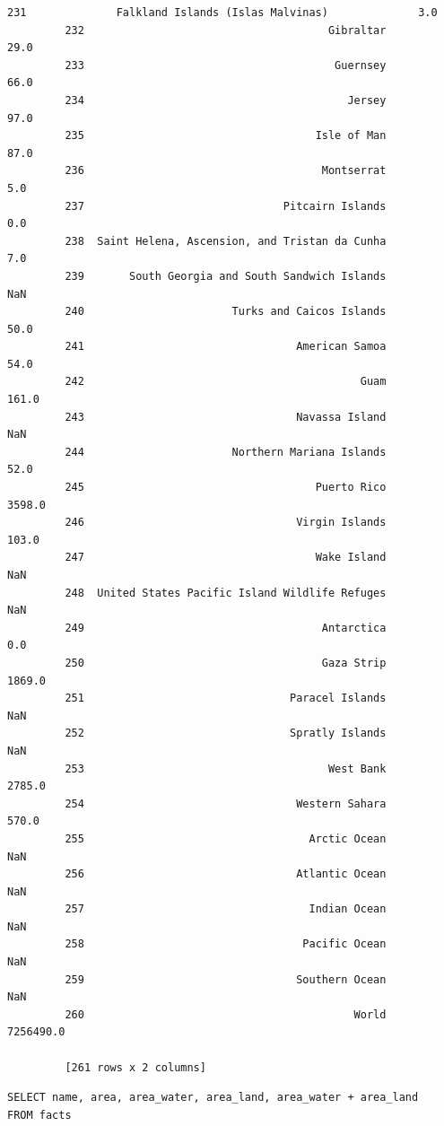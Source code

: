 \documentclass[11pt]{article}
\begin{document}
\begin{Verbatim}[commandchars=\\\{\}]
         231              Falkland Islands (Islas Malvinas)              3.0
         232                                      Gibraltar             29.0
         233                                       Guernsey             66.0
         234                                         Jersey             97.0
         235                                    Isle of Man             87.0
         236                                     Montserrat              5.0
         237                               Pitcairn Islands              0.0
         238  Saint Helena, Ascension, and Tristan da Cunha              7.0
         239       South Georgia and South Sandwich Islands              NaN
         240                       Turks and Caicos Islands             50.0
         241                                 American Samoa             54.0
         242                                           Guam            161.0
         243                                 Navassa Island              NaN
         244                       Northern Mariana Islands             52.0
         245                                    Puerto Rico           3598.0
         246                                 Virgin Islands            103.0
         247                                    Wake Island              NaN
         248  United States Pacific Island Wildlife Refuges              NaN
         249                                     Antarctica              0.0
         250                                     Gaza Strip           1869.0
         251                                Paracel Islands              NaN
         252                                Spratly Islands              NaN
         253                                      West Bank           2785.0
         254                                 Western Sahara            570.0
         255                                   Arctic Ocean              NaN
         256                                 Atlantic Ocean              NaN
         257                                   Indian Ocean              NaN
         258                                  Pacific Ocean              NaN
         259                                 Southern Ocean              NaN
         260                                          World        7256490.0
         
         [261 rows x 2 columns]
\end{Verbatim}
            
    \begin{verbatim}
SELECT name, area, area_water, area_land, area_water + area_land 
FROM facts
\end{verbatim}
\end{document}
